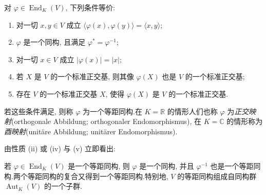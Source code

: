 \begin{theorem}\label{thm:7.5.1}
对 $\varphi \in \operatorname{End}_K(V)$, 下列条件等价:
\begin{enumerate}
\item[(i)] 对一切 $x, y \in V$ 成立 $\bigl\langle \varphi(x), \varphi(y) \bigr\rangle = \langle x, y \rangle$;
\item[(ii)] $\varphi$ 是一个同构, 且满足 $\varphi^* = \varphi^{-1}$;
\item[(iii)] 对一切 $x \in V$ 成立 $|\varphi(x)| = |x|$;
\item[(iv)] 若 $X$ 是 $V$ 的一个标准正交基, 则其像 $\varphi(X)$ 也是 $V$ 的一个标准正交基;
\item[(v)] 存在 $V$ 的一个标准正交基 $X$, 使得 $\varphi(X)$ 是 $V$ 的一个标准正交基.
\end{enumerate}

若这些条件满足, 则称 $\varphi$ 为一个等距同构.在 $K = \mathbb{R}$ 的情形人们也称 $\varphi$ 为\emph{正交映射}(\textup{orthogonale Abbildung; orthogonaler Endomorphismus}), 在 $K = \mathbb{C}$ 的情形称为\emph{酉映射}(\textup{unitäre Abbildung; unitärer Endomorphismus}).
\end{theorem}

由性质 (ii) 或 (iv) 与 (v) 立即看出:

\begin{corollary}\label{cor:7.5.2}
若 $\varphi \in \operatorname{End}_K(V)$ 是一个等距同构, 则 $\varphi$ 是一个同构, 并且 $\varphi^{-1}$ 也是一个等距同构.两个等距同构的复合又得到一个等距同构.特别地, $V$ 的等距同构组成自同构群 $\operatorname{Aut}_K(V)$ 的一个子群.
\end{corollary}

